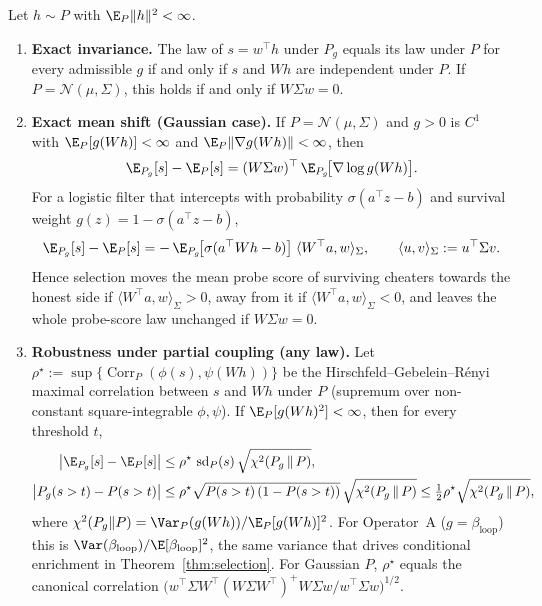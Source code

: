 \begin{theorem}\label{thm:geometry-selection}
Let $h \sim P$ with $\E_P\|h\|^2 < \infty$.
\begin{enumerate}
  \item \textbf{Exact invariance.} The law of $s = w^\top h$ under $P_g$ equals its law under $P$ for every admissible $g$ if and only if $s$ and $Wh$ are independent under $P$. If $P = \mathcal{N}(\mu, \Sigma)$, this holds if and only if $W \Sigma w = 0$.
  \item \textbf{Exact mean shift (Gaussian case).} If $P = \mathcal{N}(\mu, \Sigma)$ and $g > 0$ is $C^1$ with $\E_P[g(Wh)] < \infty$ and $\E_P\|\nabla g(Wh)\| < \infty$, then
  \begin{equation}\label{eq:stein-shift}
    \E_{P_g}[s] - \E_P[s] = (W \Sigma w)^\top\, \E_{P_g}\!\big[\nabla \log g(Wh)\big].
  \end{equation}
  For a logistic filter that intercepts with probability $\sigma(a^\top z - b)$ and survival weight $g(z) = 1 - \sigma(a^\top z - b)$,
  \begin{equation}\label{eq:logistic-shift}
    \E_{P_g}[s] - \E_P[s] = -\,\E_{P_g}\!\big[\sigma(a^\top W h - b)\big]\; \langle W^\top a, w \rangle_{\Sigma},
    \qquad \langle u, v \rangle_\Sigma := u^\top \Sigma v.
  \end{equation}
  Hence selection moves the mean probe score of surviving cheaters towards the honest side if $\langle W^\top a, w\rangle_\Sigma > 0$, away from it if $\langle W^\top a, w\rangle_\Sigma < 0$, and leaves the whole probe-score law unchanged if $W\Sigma w = 0$.
  \item \textbf{Robustness under partial coupling (any law).} Let $\rho^\star := \sup\{\operatorname{Corr}_P(\phi(s), \psi(Wh))\}$ be the Hirschfeld--Gebelein--R\'enyi maximal correlation between $s$ and $Wh$ under $P$ (supremum over non-constant square-integrable $\phi, \psi$). If $\E_P[g(Wh)^2] < \infty$, then for every threshold $t$,
  \begin{align}
    \big|\E_{P_g}[s] - \E_P[s]\big| &\le \rho^\star\, \operatorname{sd}_P(s)\, \sqrt{\chi^2(P_g \,\|\, P)}, \label{eq:robust-mean}\\
    \big|P_g(s > t) - P(s > t)\big| &\le \rho^\star \sqrt{P(s>t)\,(1 - P(s>t))}\, \sqrt{\chi^2(P_g \,\|\, P)} \le \tfrac12 \rho^\star \sqrt{\chi^2(P_g \,\|\, P)}, \label{eq:robust-tpr}
  \end{align}
  where $\chi^2(P_g \| P) = \Var_P(g(Wh)) / \E_P[g(Wh)]^2$. For Operator~A ($g = \beta_{\mathrm{loop}}$) this is $\Var(\beta_{\mathrm{loop}})/\E[\beta_{\mathrm{loop}}]^2$, the same variance that drives conditional enrichment in Theorem~\ref{thm:selection}. For Gaussian $P$, $\rho^\star$ equals the canonical correlation $\big(w^\top \Sigma W^\top (W\Sigma W^\top)^{+} W \Sigma w / w^\top \Sigma w\big)^{1/2}$.
\end{enumerate}
\end{theorem}

